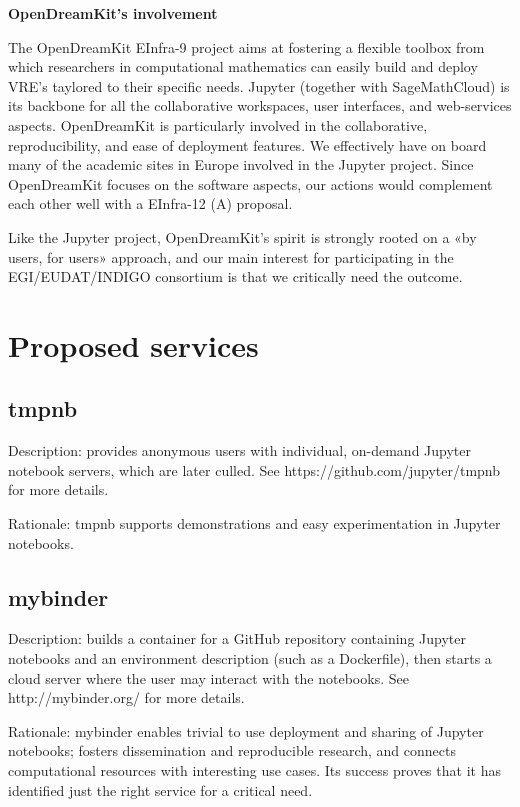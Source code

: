 \textbf{OpenDreamKit's involvement}

The OpenDreamKit EInfra-9 project aims at fostering a flexible toolbox
from which researchers in computational mathematics can easily build
and deploy VRE's taylored to their specific needs. Jupyter (together
with SageMathCloud) is its backbone for all the collaborative
workspaces, user interfaces, and web-services aspects. OpenDreamKit is
particularly involved in the collaborative, reproducibility, and ease
of deployment features. We effectively have on board many of the
academic sites in Europe involved in the Jupyter project. Since
OpenDreamKit focuses on the software aspects, our actions would
complement each other well with a EInfra-12 (A) proposal.

Like the Jupyter project, OpenDreamKit's spirit is strongly rooted on
a «by users, for users» approach, and our main interest for
participating in the EGI/EUDAT/INDIGO consortium is that we critically
need the outcome.

\section{Proposed services}

\subsection{tmpnb}

Description: provides anonymous users with individual, on-demand Jupyter
notebook servers, which are later culled. See https://github.com/jupyter/tmpnb
for more details.

Rationale: tmpnb supports demonstrations and easy experimentation in
Jupyter notebooks.


\subsection{mybinder}

Description: builds a container for a GitHub repository containing
Jupyter notebooks and an environment description (such as a
Dockerfile), then starts a cloud server where the user may interact
with the notebooks. See http://mybinder.org/ for more details.

Rationale: mybinder enables trivial to use deployment and sharing of
Jupyter notebooks; fosters dissemination and reproducible research,
and connects computational resources with interesting use cases.
Its success proves that it has identified just the right service for
a critical need.

